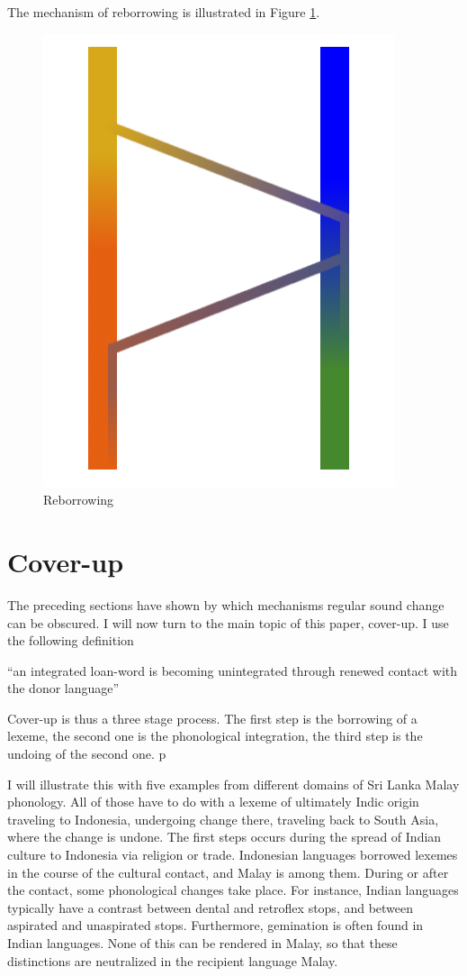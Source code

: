 \documentclass[a4paper,10pt]{article}
\begin{document}
The mechanism of reborrowing is illustrated in Figure \ref{fig:reborrowing}.

\begin{figure}
\centering
    \includegraphics[height=.3\textheight]{reborrowing.png}
 \caption{Reborrowing}
\label{fig:reborrowing}
\end{figure}

 
\section{Cover-up}
The preceding sections have shown by which mechanisms regular sound change can be obscured. I will now turn to the main topic of this paper, cover-up. I use the following definition

\ea ``an integrated loan-word is becoming unintegrated through renewed contact with the donor language'' \z

Cover-up is thus a three stage process. The first step is the borrowing of a lexeme, the second one is the phonological integration, the third step is the undoing of the second one. p 

I will illustrate this with five examples from different domains of Sri Lanka Malay phonology. All of those have to do with a lexeme of ultimately Indic origin traveling to Indonesia, undergoing change there, traveling back to South Asia, where the change is undone. The first steps occurs during the spread of Indian culture to Indonesia via religion or trade. Indonesian languages borrowed lexemes in the course of the cultural contact, and Malay is among them. During or after the contact, some phonological changes take place. For instance, Indian languages typically have a contrast between dental and retroflex stops, and between aspirated and unaspirated stops. Furthermore, gemination is often found in Indian languages. None of this can be rendered in Malay, so that these distinctions are neutralized in the recipient language Malay. 
\end{document}
